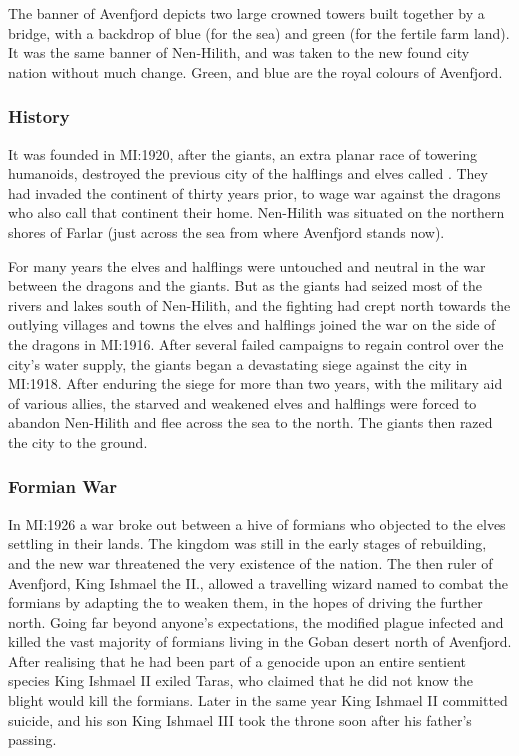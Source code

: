 The banner of Avenfjord depicts two large crowned towers built together by a
bridge, with a backdrop of blue (for the sea) and green (for the fertile farm
land). It was the same banner of Nen-Hilith, and was taken to the new found
city nation without much change. Green, and blue are the royal colours of
Avenfjord.

\subsubsection{History}

It was founded in MI:1920, after the giants, an extra planar race of towering
humanoids, destroyed the previous city of the halflings and elves called
. They had invaded the continent of
 thirty years prior, to wage war against the dragons who
also call that continent their home. Nen-Hilith was situated on the northern
shores of Farlar (just across the sea from where Avenfjord stands now).

For many years the elves and halflings were untouched and neutral in the war
between the dragons and the giants. But as the giants had seized most of the
rivers and lakes south of Nen-Hilith, and the fighting had crept north towards
the outlying villages and towns the elves and halflings joined the war on the
side of the dragons in MI:1916. After several failed campaigns to regain
control over the city's water supply, the giants began a devastating siege
against the city in MI:1918. After enduring the siege for more than two years,
with the military aid of various allies, the starved and weakened elves and
halflings were forced to abandon Nen-Hilith and flee across the sea to the
north. The giants then razed the city to the ground.

\subsubsection{Formian War}
\label{sec:Formian War}

In MI:1926 a war broke out between a hive of formians who objected to the
elves settling in their lands. The kingdom was still in the early stages of
rebuilding, and the new war threatened the very existence of the nation. The
then ruler of Avenfjord, King Ishmael the II., allowed a travelling wizard
named  to combat the formians by adapting the
 to weaken them, in the hopes of driving the further
north. Going far beyond anyone's expectations, the modified plague infected
and killed the vast majority of formians living in the Goban desert north of
Avenfjord. After realising that he had been part of a genocide upon an entire
sentient species King Ishmael II exiled Taras, who claimed that he did not
know the blight would kill the formians. Later in the same year King Ishmael
II committed suicide, and his son King Ishmael III took the throne soon after
his father's passing.

